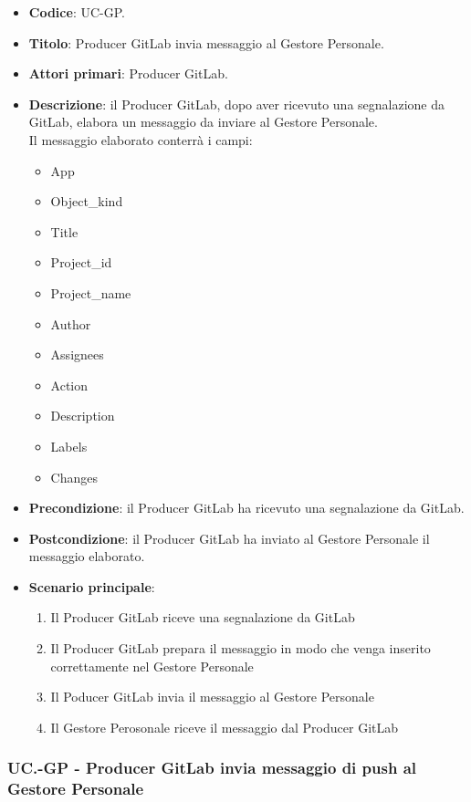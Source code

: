 	\begin{itemize}
		\item \textbf{Codice}: UC\theuccount-GP.
		\item \textbf{Titolo}: Producer GitLab invia messaggio al Gestore Personale.
		\item \textbf{Attori primari}: Producer GitLab.
		\item \textbf{Descrizione}: il Producer GitLab, dopo aver ricevuto una segnalazione da GitLab, elabora un messaggio da inviare al Gestore Personale. \\ Il messaggio elaborato conterrà i campi:
		\begin{itemize}
			\item App
			\item Object\_kind
			\item Title
			\item Project\_id
			\item Project\_name
			\item Author
			\item Assignees
			\item Action
			\item Description
			\item Labels
			\item Changes
		\end{itemize}
		\item \textbf{Precondizione}: il Producer GitLab ha ricevuto una segnalazione da GitLab.
		\item \textbf{Postcondizione}: il Producer GitLab ha inviato al Gestore Personale il messaggio  \newline elaborato.
		\item \textbf{Scenario principale}:
		\begin{enumerate}
			\item Il Producer GitLab riceve una segnalazione da GitLab
			\item Il Producer GitLab prepara il messaggio in modo che venga inserito correttamente nel Gestore Personale
			\item Il Poducer GitLab invia il messaggio al Gestore Personale
            \item Il Gestore Perosonale riceve il messaggio dal Producer GitLab
		\end{enumerate}

	\end{itemize}


	\subsubsection{UC\theuccount.\thesubuccount-GP - Producer GitLab invia messaggio di push al Gestore Personale}

